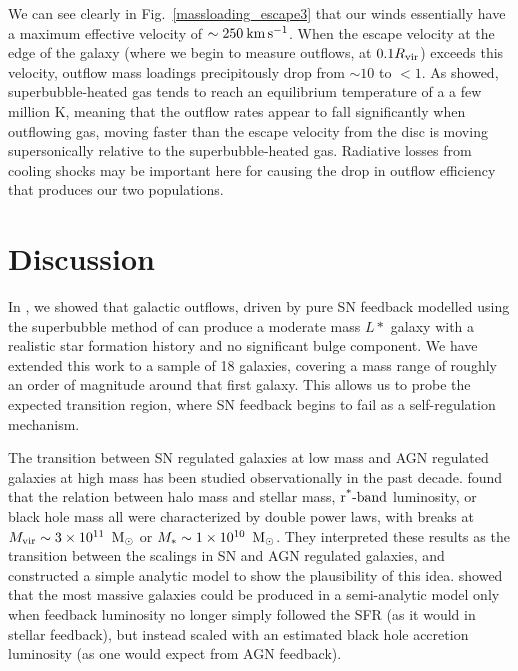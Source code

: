 We can see clearly in Fig.~\ref{massloading_escape3} that our winds essentially
have a maximum effective velocity of $\sim250\>{\rm km}\,{\rm s}^{-1}$.  When the escape velocity
at the edge of the galaxy (where we begin to measure outflows, at $0.1R_{\rm vir}$)
exceeds this velocity, outflow mass loadings precipitously drop from $\sim10$ to
$<1$.  As \citet{Keller2014} showed, superbubble-heated gas tends to reach an
equilibrium temperature of a a few million K, meaning that the
outflow rates appear to fall significantly when outflowing gas, moving faster
than the escape velocity from the disc is moving supersonically relative to the
superbubble-heated gas.  Radiative losses from cooling shocks may be important
here for causing the drop in outflow efficiency that produces our two
populations.


\section{Discussion}
In \citet{Keller2015}, we showed that galactic outflows, driven by
pure SN feedback modelled using the superbubble method of \citet{Keller2014} can
produce a moderate mass  $L*$ galaxy with a realistic star formation history and
no significant bulge component.  We have extended this work to a sample
of 18 galaxies, covering a mass range of roughly an order of magnitude around
that first galaxy.  This allows us to probe the expected transition
region, where SN feedback begins to fail as a self-regulation mechanism.

The transition between SN regulated galaxies at low mass and AGN regulated galaxies
at high mass has been studied observationally in the past decade.  \citet{Shankar2006}
found that the relation between halo mass and stellar mass,
$\operatorname{r^*-\rm{band}}$
luminosity, or black hole mass all were characterized by double power laws, with
breaks at $M_{\rm vir}\sim3\times10^{11}\;\>{\rm M_{\odot}}$ or $M_*\sim1\times10^{10}\;\>{\rm M_{\odot}}$.
They interpreted these results as the transition between the scalings in SN and
AGN regulated galaxies, and constructed a simple analytic model to show the
plausibility of this idea.  \citet{Croton2006} showed that the most massive
galaxies could be produced in a semi-analytic model only when feedback
luminosity no longer simply followed the SFR (as it would in
stellar feedback), but instead scaled with an estimated black hole accretion
luminosity (as one would expect from AGN feedback).  

